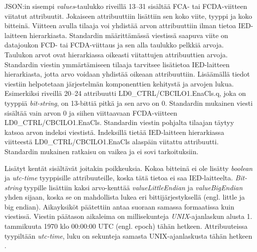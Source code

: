JSON:in sisempi \emph{values}-taulukko riveillä 13--31 sisältää FCA- tai FCDA-viitteen viitatut attribuutit. Jokaiseen attribuuttiin lisättiin sen koko viite, tyyppi ja koko bitteinä. Viitteen avulla tilaaja voi yhdistää arvon attribuuttiin ilman tietoa IED-laitteen hierarkiasta. Standardin määrittämässä viestissä saapuva viite on datajoukon FCD- tai FCDA-viittaus ja sen alla taulukko pelkkiä arvoja. Taulukon arvot ovat hierarkiassa oikeasti viitattujen attribuuttien arvoja. Standardin viestin ymmärtämiseen tilaaja tarvitsee lisätietoa IED-laitteen hierarkiasta, jotta arvo voidaan yhdistää oikeaan attribuuttiin. Lisäämällä tiedot viestiin helpotetaan järjestelmän komponenttien kehitystä ja arvojen lukua. Esimerkiksi riveillä 20--24 attribuutti LD0\_CTRL/CBCILO1.EnaCls.q, joka on tyyppiä \emph{bit-string}, on 13-bittiä pitkä ja sen arvo on 0. Standardin mukainen viesti sisältää vain arvon 0 ja siihen viittaavaan FCDA-viitteen LD0\_CTRL/CBCILO1.EnaCls. Standardin viestin pohjalta tilaajan täytyy katsoa arvon indeksi viestistä. Indeksillä tietää IED-laitteen hierarkiassa viitteestä LD0\_CTRL/CBCILO1.EnaCls alaspäin viitattu attribuutti. Standardin mukainen ratkaisu on vaikea ja ei sovi tarkoituksiin.

Lisätyt kentät sisältävät joitakin poikkeuksia. Kokoa bitteinä ei ole lisätty \emph{boolean} ja \emph{utc-time} tyyppisille attribuuteille, koska tätä tietoa ei saa IED-laitteelta. \emph{Bit-string} tyypille lisättiin kaksi arvo-kenttää \emph{valueLittleEndian} ja \emph{valueBigEndian} yhden sijaan, koska se on mahdollista lukea eri bittijärjestyksellä (engl. little ja big endian). Aikayksiköt päätettiin antaa suoraan samassa formaatissa kuin viestissä. Viestin päätason aikaleima on millisekunteja \emph{UNIX}-ajanlaskun alusta 1. tammikuuta 1970 klo 00:00:00 UTC (engl. epoch) tähän hetkeen. Attribuuteissa tyypiltään \emph{utc-time}, luku on sekunteja samasta UNIX-ajanlaskusta tähän hetkeen \mbox{\cite[s.~26--27]{IEC61850-7-2}}.